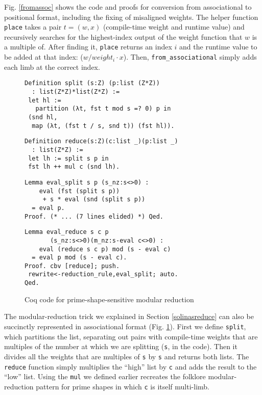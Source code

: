 \documentclass[conference,letterpaper]{IEEEtran}
\begin{document}
Fig. \ref{fromassoc} shows the code and proofs for conversion from associational to positional format, including the fixing of misaligned weights.
The helper function \texttt{place} takes a pair $t = (w, x)$ (compile-time weight and runtime value) and recursively searches for the highest-index output of the weight function that $w$ is a multiple of.
After finding it, \texttt{place} returns an index $i$ and the runtime value to be added at that index: ($w / weight_i \cdot x$).
Then, \texttt{from\_associational} simply adds each limb at the correct index.

\begin{figure}
\begin{verbatim}
Definition split (s:Z) (p:list (Z*Z))
  : list(Z*Z)*list(Z*Z) :=
 let hl :=
   partition (λt, fst t mod s =? 0) p in
 (snd hl,
  map (λt, (fst t / s, snd t)) (fst hl)).
\end{verbatim}
\begin{verbatim}
Definition reduce(s:Z)(c:list _)(p:list _)
  : list(Z*Z) :=
 let lh := split s p in
 fst lh ++ mul c (snd lh).
\end{verbatim}
\begin{verbatim}
Lemma eval_split s p (s_nz:s<>0) :
    eval (fst (split s p))
     + s * eval (snd (split s p))
  = eval p.
Proof. (* ... (7 lines elided) *) Qed.
\end{verbatim}
\begin{verbatim}
Lemma eval_reduce s c p
       (s_nz:s<>0)(m_nz:s-eval c<>0) :
    eval (reduce s c p) mod (s - eval c)
  = eval p mod (s - eval c).
Proof. cbv [reduce]; push.
 rewrite<-reduction_rule,eval_split; auto.
Qed.
\end{verbatim}
\caption{\label{splitreduce}Coq code for prime-shape-sensitive modular reduction}
\end{figure}

The modular-reduction trick we explained in Section \ref{solinasreduce} can also be succinctly represented in associational format (Fig. \ref{splitreduce}).
First we define \texttt{split}, which partitions the list, separating out pairs with compile-time weights that are multiples of the number at which we are splitting (\texttt{s}, in the code).
Then it divides all the weights that are multiples of \texttt{s} by \texttt{s} and returns both lists.
The \texttt{reduce} function simply multiplies the ``high'' list by \texttt{c} and adds the result to the ``low'' list.
Using the \texttt{mul} we defined earlier recreates the folklore modular-reduction pattern for prime shapes in which \texttt{c} is itself multi-limb.
\end{document}
